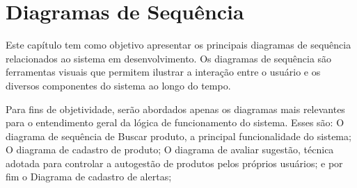 \chapter{Diagramas de Sequência} \label{cha:diagramassequencia}



Este capítulo tem como objetivo apresentar os principais diagramas de sequência relacionados ao sistema em desenvolvimento. Os diagramas de sequência são ferramentas visuais que permitem ilustrar a interação entre o usuário e os diversos componentes do sistema ao longo do tempo.

Para fins de objetividade, serão abordados apenas os diagramas mais relevantes para o entendimento geral da lógica de funcionamento do sistema. Esses são: O diagrama de sequência de Buscar produto, a principal funcionalidade do sistema; O diagrama de cadastro de produto; O diagrama de avaliar sugestão, técnica adotada para controlar a autogestão de produtos pelos próprios usuários; e por fim o Diagrama de cadastro de alertas; 

\pagebreak 
